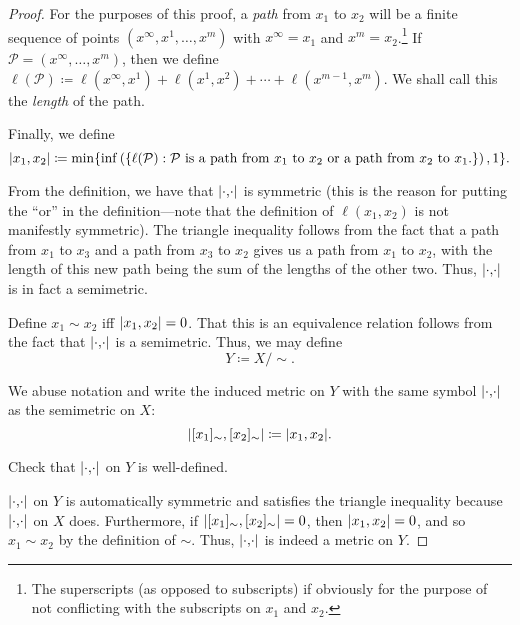 \begin{thm}
\begin{savenotes}
\begin{proof}
For the purposes of this proof, a \emph{path} from $x_1$ to $x_2$ will be a finite sequence of points $(x^\infty,x^1,\ldots ,x^m)$ with $x^\infty=x_1$ and $x^m=x_2$.\footnote{The superscripts (as opposed to subscripts) if obviously for the purpose of not conflicting with the subscripts on $x_1$ and $x_2$.}  If $\mathcal{P}=(x^\infty,\ldots ,x^m)$, then we define $\ell (\mathcal{P})\coloneqq \ell (x^\infty,x^1)+\ell (x^1,x^2)+\cdots +\ell (x^{m-1},x^m)$.   We shall call this the \emph{length} of the path.

Finally, we define
\begin{equation}
\metric[x_1][x_2]\coloneqq \min \{ \inf \left( \left\{ \ell (\mathcal{P}):\mathcal{P}\text{ is a path from }x_1\text{ to }x_2\text{ or a path from }x_2\text{ to }x_1\text{.}\right\} \right) ,1\} .
\end{equation}

From the definition, we have that $\metric$ is symmetric (this is the reason for putting the ``or'' in the definition---note that the definition of $\ell (x_1,x_2)$ is not manifestly symmetric).  The triangle inequality follows from the fact that a path from $x_1$ to $x_3$ and a path from $x_3$ to $x_2$ gives us a path from $x_1$ to $x_2$, with the length of this new path being the sum of the lengths of the other two.  Thus, $\metric$ is in fact a semimetric.

Define $x_1\sim x_2$ iff $\metric[x_1][x_2]=0$.  That this is an equivalence relation follows from the fact that $\metric$ is a semimetric.  Thus, we may define
\begin{equation}
Y\coloneqq X/\sim .
\end{equation}

We abuse notation and write the induced metric on $Y$ with the same symbol $\metric$ as the semimetric on $X$:
\begin{equation}
\metric[[x_1]_{\sim}][[x_2]_{\sim}]\coloneqq \metric[x_1][x_2].
\end{equation}
\begin{exr}
Check that $\metric$ on $Y$ is well-defined.
\end{exr}

$\metric$ on $Y$ is automatically symmetric and satisfies the triangle inequality because $\metric$ on $X$ does.  Furthermore, if $\metric[[x_1]_{\sim}][[x_2]_{\sim}]=0$, then $\metric[x_1][x_2]=0$, and so $x_1\sim x_2$ by the definition of $\sim$.  Thus, $\metric$ is indeed a metric on $Y$.


\end{proof}
\end{savenotes}
\end{thm}
